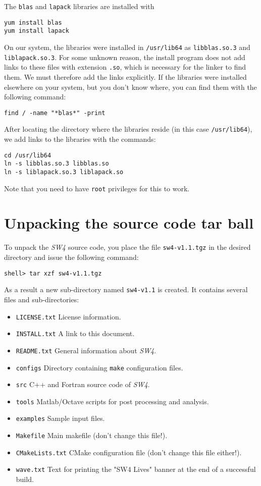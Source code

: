 \documentclass[11pt]{article}
\begin{document}
The \verb+blas+ and \verb+lapack+ libraries are installed with
\begin{verbatim}
yum install blas
yum install lapack
\end{verbatim}
On our system, the libraries were installed in \verb+/usr/lib64+ as \verb+libblas.so.3+ and
\verb+liblapack.so.3+. For some unknown reason, the install program does not add links to these
files with extension \verb+.so+, which is necessary for the linker to find them. We must therefore
add the links explicitly. If the libraries were installed elsewhere on your system, but you don't
know where, you can find them with the following command:
\begin{verbatim}
find / -name "*blas*" -print
\end{verbatim}
After locating the directory where the libraries reside (in this case \verb+/usr/lib64+), we add
links to the libraries with the commands:
\begin{verbatim}
cd /usr/lib64
ln -s libblas.so.3 libblas.so
ln -s liblapack.so.3 liblapack.so
\end{verbatim}
Note that you need to have \verb+root+ privileges for this to work.

\section{Unpacking the source code tar ball}

To unpack the \emph{SW4} source code, you place the file \verb+sw4-v1.1.tgz+ in the
desired directory and issue the following command:
\begin{verbatim}
shell> tar xzf sw4-v1.1.tgz
\end{verbatim}
As a result a new sub-directory named \verb+sw4-v1.1+ is created. It contains several files
and sub-directories:
%
\begin{itemize}
\item \verb+LICENSE.txt+ License information.
\item \verb+INSTALL.txt+ A link to this document.
\item \verb+README.txt+ General information about \emph{SW4}.
\item \verb+configs+ Directory containing \verb+make+ configuration files.
\item \verb+src+ C++ and Fortran source code of \emph{SW4}.
\item \verb+tools+ Matlab/Octave scripts for post processing and analysis.
\item \verb+examples+ Sample input files.
\item \verb+Makefile+ Main makefile (don't change this file!).
\item \verb+CMakeLists.txt+ CMake configuration file (don't change this file either!).
\item \verb+wave.txt+ Text for printing the "SW4 Lives" banner at the end of a successful build.
\end{itemize}
\end{document}
